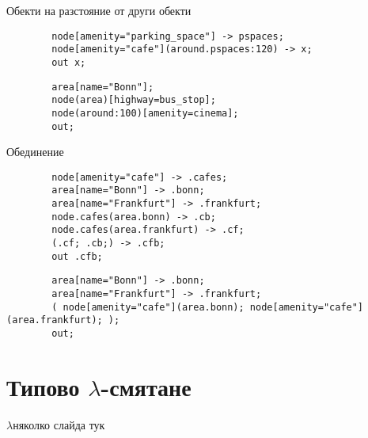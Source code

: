 \documentclass[9pt]{beamer}
\begin{document}
  \begin{frame}[fragile]{Обекти на разстояние от други обекти}
    \begin{lstwrap}\begin{lstlisting}
        node[amenity="parking_space"] -> pspaces;
        node[amenity="cafe"](around.pspaces:120) -> x;
        out x;
    \end{lstlisting}\end{lstwrap}
    \begin{lstwrap}\begin{lstlisting}
        area[name="Bonn"];
        node(area)[highway=bus_stop];
        node(around:100)[amenity=cinema];
        out;
    \end{lstlisting}\end{lstwrap}
  \end{frame}

  \begin{frame}[fragile]{Обединение}
    \begin{lstwrap}\begin{lstlisting}
        node[amenity="cafe"] -> .cafes;
        area[name="Bonn"] -> .bonn;
        area[name="Frankfurt"] -> .frankfurt;
        node.cafes(area.bonn) -> .cb;
        node.cafes(area.frankfurt) -> .cf;
        (.cf; .cb;) -> .cfb;
        out .cfb;
    \end{lstlisting}\end{lstwrap}

    \begin{lstwrap}\begin{lstlisting}
        area[name="Bonn"] -> .bonn;
        area[name="Frankfurt"] -> .frankfurt;
        ( node[amenity="cafe"](area.bonn); node[amenity="cafe"](area.frankfurt); );
        out;
    \end{lstlisting}\end{lstwrap}
  \end{frame}

  \section{Типово $\lambda$-смятане}
  \begin{frame}{$\lambda$}няколко слайда тук\end{frame}
\end{document}
